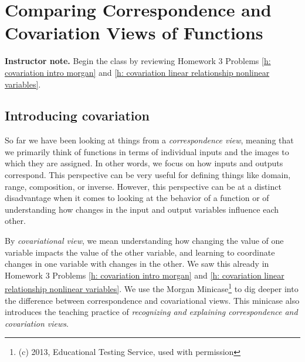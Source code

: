 \documentclass[11pt]{article}
\newcommand\smallnote[1]
	{\begin{mdframed}\raggedright  {\bf Instructor note.} {#1} \end{mdframed}}
\theoremstyle{definition}
\begin{document}

\newpage 
\section{Comparing Correspondence and Covariation Views of Functions}
\label{s: function covariation}

\smallnote{Begin the class by reviewing Homework 3 Problems \ref{h: covariation intro morgan} and \ref{h: covariation linear relationship nonlinear variables}.}

\subsection{Introducing covariation}

So far we have been looking at things from a {\it correspondence view}, meaning that we primarily think of functions in terms of individual inputs and the images to which they are assigned. In other words, we focus on how inputs and outputs correspond. This perspective can be very useful for defining things like domain, range, composition, or inverse. However, this perspective can be at a distinct disadvantage when it comes to looking at the behavior of a function or of understanding how changes in the input and output variables influence each other. 

By {\it covariational view}, we mean understanding how changing the value of one variable impacts the value of the other variable, and learning to coordinate changes in one variable with changes in the other. We saw this already in Homework 3 Problems \ref{h: covariation intro morgan} and \ref{h: covariation linear relationship nonlinear variables}. We use the Morgan Minicase\footnote{(c) 2013, Educational Testing Service, used with permission} to dig deeper into the difference between correspondence and covariational views. This minicase also introduces the teaching practice of {\it recognizing and explaining correspondence and covariation views}. 

\end{document}
